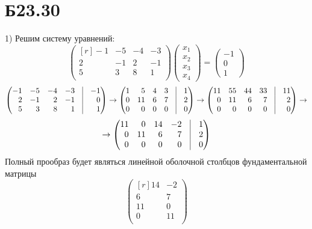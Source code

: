 \section*{Б23.30}1)
Решим систему уравнений:
$$\begin{pmatrix*}[r]
    -1&-5&-4&-3\\
    2&-1&2&-1\\
    5&3&8&1\\
\end{pmatrix*}\begin{pmatrix*}
    x_1\\
    x_2\\
    x_3\\
    x_4
\end{pmatrix*}=\begin{pmatrix*}
    -1\\
    0\\
    1
\end{pmatrix*}$$
$$\begin{pmatrix*}[r]
    -1&-5&-4&-3&\vline&-1\\
    2&-1&2&-1&\vline&0\\
    5&3&8&1&\vline&1\\
\end{pmatrix*}\rightarrow\begin{pmatrix*}[r]
    1&5&4&3&\vline&1\\
    0&11&6&7&\vline&2\\
    0&0&0&0&\vline&0\\
\end{pmatrix*}\rightarrow\begin{pmatrix*}[r]
    11&55&44&33&\vline&11\\
    0&11&6&7&\vline&2\\
    0&0&0&0&\vline&0\\
\end{pmatrix*}\rightarrow$$
$$\rightarrow\begin{pmatrix*}[r]
    11&0&14&-2&\vline&1\\
    0&11&6&7&\vline&2\\
    0&0&0&0&\vline&0\\
\end{pmatrix*}$$
Полный прообраз будет являться линейной оболочной столбцов фундаментальной матрицы $$\begin{pmatrix*}[r]
    14&-2\\
    6&7\\
    11&0\\
    0&11\\
\end{pmatrix*}$$
